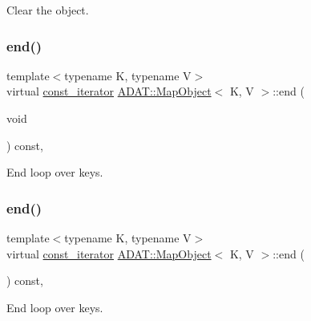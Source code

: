 Clear the object. 

\mbox{\label{classADAT_1_1MapObject_a1162459ba16798247ab64ee38be25bca}} 
\subsubsection{\texorpdfstring{end()}{end()}\hspace{0.1cm}{\footnotesize\ttfamily [1/3]}}
{\footnotesize\ttfamily template$<$typename K, typename V$>$ \\
virtual \mbox{\hyperlink{classADAT_1_1MapObject_a4622cd7d3b6fed18fe226d28091cc6c8}{const\+\_\+iterator}} \mbox{\hyperlink{classADAT_1_1MapObject}{A\+D\+A\+T\+::\+Map\+Object}}$<$ K, V $>$\+::end (\begin{DoxyParamCaption}\item[{void}]{ }\end{DoxyParamCaption}) const\hspace{0.3cm}{\ttfamily [inline]}, {\ttfamily [virtual]}}



End loop over keys. 

\mbox{\label{classADAT_1_1MapObject_a1162459ba16798247ab64ee38be25bca}} 
\subsubsection{\texorpdfstring{end()}{end()}\hspace{0.1cm}{\footnotesize\ttfamily [2/3]}}
{\footnotesize\ttfamily template$<$typename K, typename V$>$ \\
virtual \mbox{\hyperlink{classADAT_1_1MapObject_a4622cd7d3b6fed18fe226d28091cc6c8}{const\+\_\+iterator}} \mbox{\hyperlink{classADAT_1_1MapObject}{A\+D\+A\+T\+::\+Map\+Object}}$<$ K, V $>$\+::end (\begin{DoxyParamCaption}{ }\end{DoxyParamCaption}) const\hspace{0.3cm}{\ttfamily [inline]}, {\ttfamily [virtual]}}



End loop over keys. 

